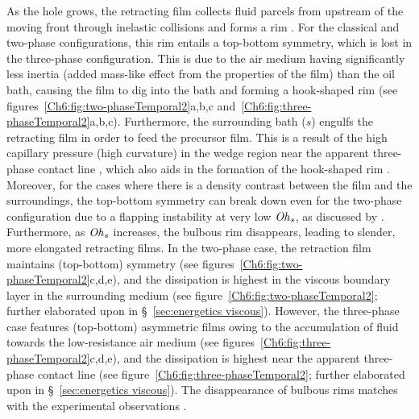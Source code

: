 As the hole grows, the retracting film collects fluid parcels from upstream of the moving front through inelastic collisions and forms a rim \citep{culick-1960-japplphys, de1996introductory, villermaux2020fragmentation}. For the classical and two-phase configurations, this rim entails a top-bottom symmetry, which is lost in the three-phase configuration. This is due to the air medium having significantly less inertia (added mass-like effect from the properties of the film) than the oil bath, causing the film to dig into the bath and forming a hook-shaped rim (see figures~\ref{Ch6:fig:two-phaseTemporal2}a,b,c and~\ref{Ch6:fig:three-phaseTemporal2}a,b,c). Furthermore, the surrounding bath ($s$) engulfs the retracting film in order to feed the precursor film. This is a result of the high capillary pressure (high curvature) in the wedge region near the apparent three-phase contact line \citep{sanjay2019droplet, cuttle2021engulfment}, which also aids in the formation of the hook-shaped rim \citep{peschka-2018-scirep}. Moreover, for the cases where there is a density contrast between the film and the surroundings, the top-bottom symmetry can break down even for the two-phase configuration due to a flapping instability at very low $\mathit{Oh}_\mathit{s}$, as discussed by \citet{lhuissier-2009-prl, jian_deng_thoraval_2020}. Furthermore, as $\mathit{Oh}_\mathit{s}$ increases, the bulbous rim disappears, leading to slender, more elongated retracting films. In the two-phase case, the retraction film maintains (top-bottom) symmetry (see figures~\ref{Ch6:fig:two-phaseTemporal2}c,d,e), and the dissipation is highest in the viscous boundary layer in the surrounding medium (see figure~\ref{Ch6:fig:two-phaseTemporal2}; further elaborated upon in \S~\ref{sec:energetics viscous}). However, the three-phase case features (top-bottom) asymmetric films owing to the accumulation of fluid towards the low-resistance air medium (see figures~\ref{Ch6:fig:three-phaseTemporal2}c,d,e), and the dissipation is highest near the apparent three-phase contact line (see figure~\ref{Ch6:fig:three-phaseTemporal2}; further elaborated upon in \S~\ref{sec:energetics viscous}).  The disappearance of bulbous rims matches with the experimental observations \citep[see \S~\ref{Ch6:sec:3-phaseTC Exp results} and][]{reyssat-2006-epl}. 

